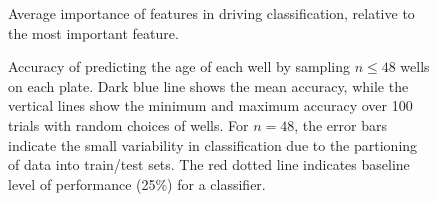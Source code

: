\documentclass{article}
\begin{document}
\begin{figure}
  \centering
  \caption{Average importance of features in driving classification,
    relative to the most important feature.}
\end{figure}

\begin{figure}
  \centering
  \caption{Accuracy of predicting the age of each well by sampling
    $n \leq 48$ wells on each plate. Dark blue line shows the mean
    accuracy, while the vertical lines show the minimum and maximum
    accuracy over 100 trials with random choices of wells.  For
    $n=48$, the error bars indicate the small variability in
    classification due to the partioning of data into train/test sets.
    The red dotted line indicates baseline level of performance (25\%)
    for a classifier.}
\end{figure}
\end{document}
